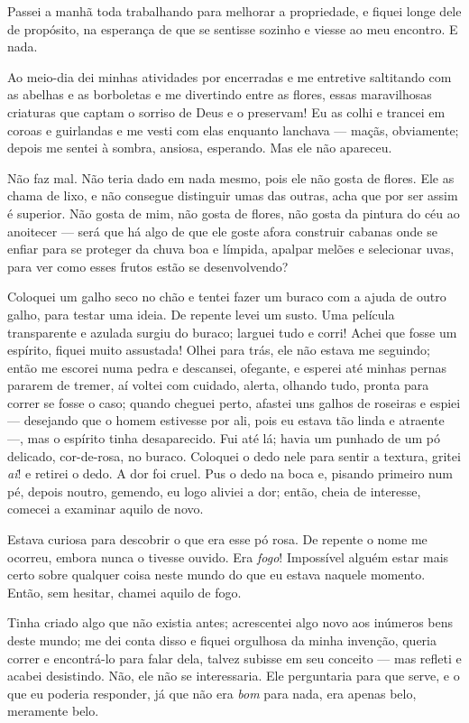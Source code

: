  Passei a manhã toda trabalhando para melhorar a propriedade, e
fiquei longe dele de propósito, na esperança de que se sentisse sozinho e
viesse ao meu encontro. E nada.

Ao meio-dia dei minhas atividades por encerradas e me entretive saltitando
com as abelhas e as borboletas e me divertindo entre as flores,
essas maravilhosas criaturas que captam o sorriso de Deus e o preservam! Eu as
colhi e trancei em coroas e guirlandas e me vesti com elas enquanto lanchava
--- maçãs, obviamente; depois me sentei à sombra, ansiosa, esperando. Mas ele não
apareceu.

Não faz mal. Não teria dado em nada mesmo, pois ele não gosta de
flores. Ele as chama de lixo, e não consegue distinguir umas das outras, acha
que por ser assim é superior. Não gosta de mim, não gosta de flores, não
gosta da pintura do céu ao anoitecer --- será que há algo de que ele
goste afora construir cabanas onde se enfiar para se proteger da chuva boa
e límpida, apalpar melões e selecionar uvas, para ver como
esses frutos estão se desenvolvendo?

Coloquei um galho seco no chão e tentei fazer um buraco com a ajuda de outro
galho, para testar uma ideia. De repente levei um susto. Uma película
transparente e azulada surgiu do buraco; larguei tudo e corri! Achei que fosse
um espírito, fiquei muito assustada! Olhei para trás, ele não estava me
seguindo; então me escorei numa pedra e descansei, ofegante, e esperei até 
minhas pernas pararem de tremer, aí voltei com cuidado, alerta, olhando tudo,
pronta para correr se fosse o caso; quando cheguei perto, afastei uns galhos
de roseiras e espiei --- desejando que o homem estivesse por ali, pois eu estava
tão linda e atraente ---, mas o espírito tinha desaparecido. Fui até lá;
havia um punhado de um pó delicado, cor-de-rosa, no buraco. Coloquei o dedo nele
para sentir a textura, gritei \textit{ai}! e retirei o dedo. A dor foi cruel.
Pus o dedo na boca e, pisando primeiro num pé, depois noutro, gemendo,
eu logo aliviei a dor; então, cheia de interesse, comecei a examinar
aquilo de novo.

Estava curiosa para descobrir o que era esse pó rosa. De repente o nome me
ocorreu, embora nunca o tivesse ouvido. Era \textit{fogo}! Impossível alguém
estar mais certo sobre qualquer coisa neste mundo do que eu estava naquele momento.
Então, sem hesitar, chamei aquilo de fogo.

Tinha criado algo que não existia antes; acrescentei algo novo aos inúmeros
bens deste mundo; me dei conta disso e fiquei orgulhosa da minha invenção,
queria correr e encontrá-lo para falar dela, talvez subisse em seu conceito
--- mas refleti e acabei desistindo. Não, ele não se interessaria. Ele perguntaria
para que serve, e o que eu poderia responder, já que não era \textit{bom}
para nada, era apenas belo, meramente belo.

